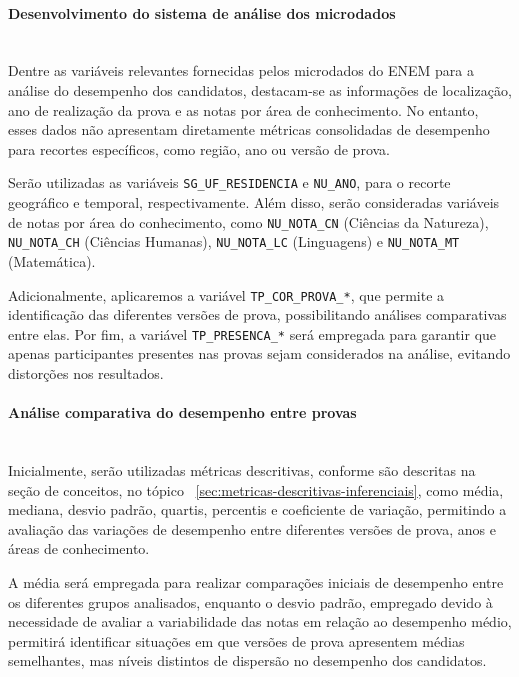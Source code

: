 \documentclass[a4paper,10pt, twocolumn]{article}
\begin{document}
\paragraph{Desenvolvimento do sistema de análise dos microdados}
\mbox{}\\

Dentre as variáveis relevantes fornecidas pelos microdados do ENEM para a análise do desempenho dos candidatos, destacam-se as informações de localização, ano de realização da prova e as notas por área de conhecimento. No entanto, esses dados não apresentam diretamente métricas consolidadas de desempenho para recortes específicos, como região, ano ou versão de prova.

Serão utilizadas as variáveis  \texttt{SG\_UF\_RESIDENCIA} e \texttt{NU\_ANO}, para o recorte geográfico e temporal, respectivamente. Além disso, serão consideradas variáveis de notas por área do conhecimento, como  \texttt{NU\_NOTA\_CN} (Ciências da Natureza), \texttt{NU\_NOTA\_CH}  (Ciências Humanas), \texttt{NU\_NOTA\_LC} (Linguagens) e \texttt{NU\_NOTA\_MT} (Matemática).

Adicionalmente, aplicaremos a variável \texttt{TP\_COR\_PROVA\_*}, que permite a identificação das diferentes versões de prova, possibilitando análises comparativas entre elas. Por fim, a variável \texttt{TP\_PRESENCA\_*} será empregada para garantir que apenas participantes presentes nas provas sejam considerados na análise, evitando distorções nos resultados.

\paragraph{Análise comparativa do desempenho entre provas}
\mbox{}\\

Inicialmente, serão utilizadas métricas descritivas, conforme são descritas na seção de conceitos, no tópico ~\ref{sec:metricas-descritivas-inferenciais}, como média, mediana, desvio padrão, quartis, percentis e coeficiente de variação, permitindo a avaliação das variações de desempenho entre diferentes versões de prova, anos e áreas de conhecimento.

A média será empregada para realizar comparações iniciais de desempenho entre os diferentes grupos analisados, enquanto o desvio padrão, empregado devido à necessidade de avaliar a variabilidade das notas em relação ao desempenho médio, permitirá identificar situações em que versões de prova apresentem médias semelhantes, mas níveis distintos de dispersão no desempenho dos candidatos.
\end{document}
